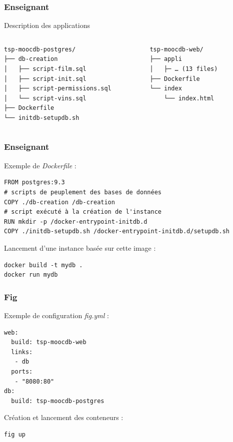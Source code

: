 \documentclass[10pt, compress]{beamer}
\begin{document}
\begin{frame}[fragile]
  \frametitle{Enseignant}
  
  Description des applications
  
  \begin{columns}[onlytextwidth]
    \begin{column}{0.5\textwidth}
      \begin{verbatim}
tsp-moocdb-postgres/
├── db-creation
│   ├── script-film.sql
│   ├── script-init.sql
│   ├── script-permissions.sql
│   └── script-vins.sql
├── Dockerfile
└── initdb-setupdb.sh
      \end{verbatim}
    \end{column}
    \begin{column}{0.5\textwidth}
      \begin{verbatim}
tsp-moocdb-web/
├── appli
│   ├─ … (13 files)
├── Dockerfile
└── index
    └── index.html
      \end{verbatim}
    \end{column}
​  \end{columns}
\end{frame}

\begin{frame}[fragile]
  \frametitle{Enseignant}

  Exemple de \emph{Dockerfile} :

  \begin{verbatim}
FROM postgres:9.3
# scripts de peuplement des bases de données
COPY ./db-creation /db-creation
# script exécuté à la création de l'instance
RUN mkdir -p /docker-entrypoint-initdb.d
COPY ./initdb-setupdb.sh /docker-entrypoint-initdb.d/setupdb.sh
  \end{verbatim}
  
  Lancement d'une instance basée sur cette image :
  
  \begin{verbatim}
docker build -t mydb .
docker run mydb
  \end{verbatim}
\end{frame}

  \begin{frame}[fragile]
  \frametitle{Fig}

  Exemple de configuration \emph{fig.yml} :

  \begin{verbatim}
web:
  build: tsp-moocdb-web
  links:
   - db
  ports:
   - "8080:80"
db:
  build: tsp-moocdb-postgres
  \end{verbatim}
  
  Création et lancement des conteneurs :
  
    \begin{verbatim}
fig up
  \end{verbatim}
\end{frame}
\end{document}
